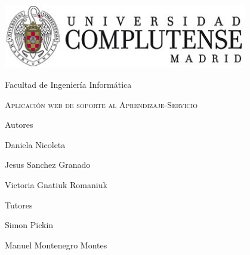 \documentclass{article}
\begin{document}
\begin{titlepage}
	\centering
	{\includegraphics[width=0.8\textwidth]{logo}\par}
	\vspace{1cm}
	{\Large Facultad de Ingeniería Informática \par}
	\vspace{3cm}
	{\scshape\Huge Aplicación web de soporte al Aprendizaje-Servicio \par}
	\vspace{5cm}
	{\textbf\Large Autores \par}
	{\Large Daniela Nicoleta \par}
	{\Large Jesus Sanchez Granado \par}
	{\Large Victoria Gnatiuk Romaniuk \par}
	\vspace{2cm}
	{\textbf\Large Tutores \par}
	{\Large Simon Pickin \par}
	{\Large Manuel Montenegro Montes \par}
	
\end{titlepage}

\tableofcontents
\newpage
\end{document}
